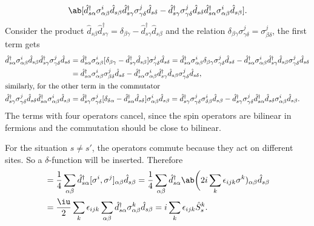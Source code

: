 \begin{solution}
\[    \ab[
      \hat d_{s\alpha}^\dagger \sigma_{\alpha\beta}^i \hat d_{s\beta}
      \hat d_{s\gamma}^\dagger \sigma_{\gamma\delta}^j \hat d_{s\delta}
    - \hat d_{s\gamma}^\dagger \sigma_{\gamma\delta}^j \hat d_{s\delta}
      \hat d_{s\alpha}^\dagger \sigma_{\alpha\beta}^i \hat d_{s\beta}].
  \]
  Consider the product
  $\hat d_{s\beta} \hat d_{s\gamma}^\dagger =
  \delta_{\beta\gamma} - \hat d_{s\gamma}^\dagger \hat d_{s\beta}$
  and the relation
  $\delta_{\beta\gamma} \sigma_{\gamma\delta}^j = \sigma_{\beta\delta}^j$,
  the first term gets
  \begin{align*}
    \hat d_{s\alpha}^\dagger \sigma_{\alpha\beta}^i \hat d_{s\beta}
    \hat d_{s\gamma}^\dagger \sigma_{\gamma\delta}^j \hat d_{s\delta}
& = \hat d_{s\alpha}^\dagger \sigma_{\alpha\beta}^i
    [\delta_{\beta\gamma} - \hat d_{s\gamma}^\dagger \hat d_{s\beta}]
    \sigma_{\gamma\delta}^j \hat d_{s\delta}
  = \hat d_{s\alpha}^\dagger \sigma_{\alpha\beta}^i \delta_{\beta\gamma}
    \sigma_{\gamma\delta}^j \hat d_{s\delta}
  - \hat d_{s\alpha}^\dagger \sigma_{\alpha\beta}^i \hat d_{s\gamma}^\dagger
    \hat d_{s\beta} \sigma_{\gamma\delta}^j \hat d_{s\delta}\\
& = \hat d_{s\alpha}^\dagger \sigma_{\alpha\beta}^i
    \sigma_{\beta\delta}^j \hat d_{s\delta}
  - \hat d_{s\alpha}^\dagger \sigma_{\alpha\beta}^i \hat d_{s\gamma}^\dagger
    \hat d_{s\beta} \sigma_{\gamma\delta}^j \hat d_{s\delta},\\
  \intertext{similarly, for the other term in the commutator}
    \hat d_{s\gamma}^\dagger \sigma_{\gamma\delta}^j \hat d_{s\delta}
    \hat d_{s\alpha}^\dagger \sigma_{\alpha\beta}^i \hat d_{s\beta}
& = \hat d_{s\gamma}^\dagger \sigma_{\gamma\delta}^j
    [\delta_{\delta\alpha} - \hat d_{s\alpha}^\dagger \hat d_{s\delta}]
    \sigma_{\alpha\beta}^i \hat d_{s\beta}
  = \hat d_{s\gamma}^\dagger \sigma_{\gamma\delta}^j
    \sigma_{\delta\beta}^i \hat d_{s\beta}
  - \hat d_{s\gamma}^\dagger \sigma_{\gamma\delta}^j \hat d_{s\alpha}^\dagger
    \hat d_{s\delta} \sigma_{\alpha\beta}^i \hat d_{s\beta}.
  \end{align*}
  The terms with four operators cancel,
  since the spin operators are bilinear in fermions
  and the commutation should be close to bilinear.

  For the situation $s \neq s'$,
  the operators commute because they act on different sites.
  So a $\delta$-function will be inserted. Therefore
  \begin{align*}
    [\hat S_s^i, \hat S_s^j]
  & = \frac14 \sum_{\alpha\beta} \hat d_{s\alpha}^\dagger
      [\sigma^i, \sigma^j]_{\alpha\beta} \hat d_{s\beta}
    = \frac14 \sum_{\alpha\beta} \hat d_{s\alpha}^\dagger
      \ab\bigg(2i \sum_k \epsilon_{ijk} \sigma^k)_{\alpha\beta}
      \hat d_{s\beta}\\
  & = \frac\iu2 \sum_k \epsilon_{ijk} \sum_{\alpha\beta}
      \hat d_{s\alpha}^\dagger \sigma_{\alpha\beta}^k \hat d_{s\beta}
    = i \sum_k \epsilon_{ijk} \hat S_s^k.
  \end{align*}
\end{solution}

